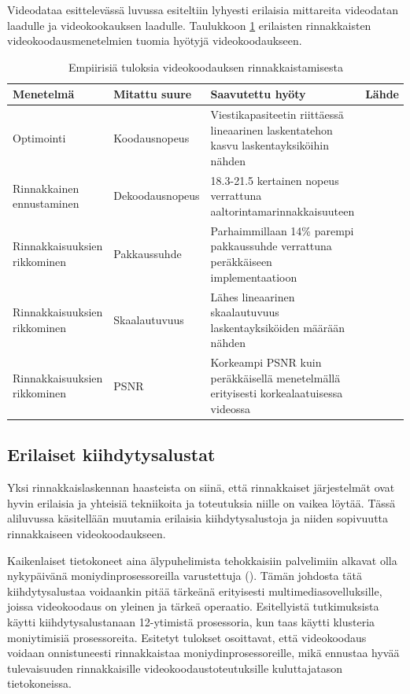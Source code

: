 Videodataa esittelevässä luvussa esiteltiin lyhyesti erilaisia mittareita videodatan
laadulle ja videokookauksen laadulle. Taulukkoon \ref{tab:results}
erilaisten rinnakkaisten videokoodausmenetelmien tuomia hyötyjä
videokoodaukseen.
\begin{longtable}{| p{} | p{}| p{}| p{}|}

	\caption{Empiirisiä tuloksia videokoodauksen rinnakkaistamisesta}
	\label{tab:results}\\
	\hline
	Menetelmä & Mitattu suure & Saavutettu hyöty & Lähde \\
	\hline\hline
	Optimointi & Koodausnopeus & Viestikapasiteetin riittäessä lineaarinen laskentatehon kasvu laskentayksiköihin nähden &
			\citealt{li} \\
	\hline
	Rinnakkainen ennustaminen & Dekoodausnopeus &
			18.3-21.5 kertainen nopeus verrattuna aaltorintamarinnakkaisuuteen & \citealt{pieters} \\
	\hline
	Rinnakkaisuuksien rikkominen & Pakkaussuhde & Parhaimmillaan 14\% parempi pakkaussuhde verrattuna
			peräkkäiseen implementaatioon & \citealt{xu} \\
	\hline
	Rinnakkaisuuksien rikkominen & Skaalautuvuus & Lähes lineaarinen skaalautuvuus laskentayksiköiden määrään nähden &
			\citealt{xu} \\
	\hline
	Rinnakkaisuuksien rikkominen & PSNR & Korkeampi PSNR kuin peräkkäisellä menetelmällä erityisesti korkealaatuisessa videossa &
			\citealt{xu} \\
	\hline 
\end{longtable}
\subsection{Erilaiset kiihdytysalustat}

Yksi rinnakkaislaskennan haasteista on siinä, että rinnakkaiset järjestelmät
ovat hyvin erilaisia ja yhteisiä tekniikoita ja toteutuksia niille on vaikea
löytää. Tässä aliluvussa käsitellään muutamia erilaisia kiihdytysalustoja ja
niiden sopivuutta rinnakkaiseen videokoodaukseen.

Kaikenlaiset tietokoneet aina älypuhelimista tehokkaisiin palvelimiin alkavat
olla nykypäivänä moniydinprosessoreilla varustettuja (\citealt{choi}). Tämän
johdosta tätä kiihdytysalustaa voidaankin pitää tärkeänä erityisesti
multimediasovelluksille, joissa videokoodaus on yleinen ja tärkeä operaatio.
Esitellyistä tutkimuksista \citealt{chi} käytti kiihdytysalustanaan 12-ytimistä
prosessoria, kun taas \citealt{li} käytti klusteria moniytimisiä prosessoreita.
Esitetyt tulokset osoittavat, että videokoodaus voidaan onnistuneesti
rinnakkaistaa moniydinprosessoreille, mikä ennustaa hyvää tulevaisuuden
rinnakkaisille videokoodaustoteutuksille kuluttajatason tietokoneissa.

